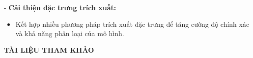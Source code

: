 \documentclass[a4paper,12pt]{article}
\begin{document}
- \textbf{Cải thiện đặc trưng trích xuất:}
    \begin{itemize}
        \item Kết hợp nhiều phương pháp trích xuất đặc trưng để tăng cường độ chính xác và khả năng phân loại của mô hình.
    \end{itemize}

\newpage
\thispagestyle{empty}
\begin{center}
    \textbf{\large TÀI LIỆU THAM KHẢO}
\end{center}
\vspace{1cm}
\sloppy
\printbibliography
\end{document}

